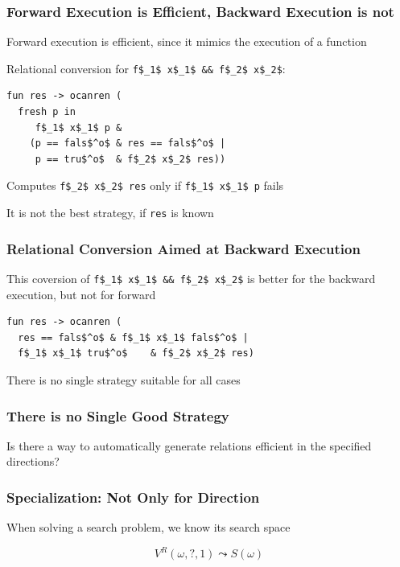 \documentclass[xcolor=table]{beamer}
\begin{document}
\begin{frame}[fragile]
  \transwipe[direction=90]
  \frametitle{Forward Execution is Efficient, Backward Execution is not}

  Forward execution is efficient, since it mimics the execution of a function

\vspace{6pt}

Relational conversion for \lstinline{f$_1$ x$_1$ && f$_2$ x$_2$}:

\begin{lstlisting}
fun res -> ocanren (
  fresh p in
     f$_1$ x$_1$ p &
    (p == fals$^o$ & res == fals$^o$ |
     p == tru$^o$  & f$_2$ x$_2$ res))
\end{lstlisting}

Computes \lstinline{f$_2$ x$_2$ res} only if \lstinline{f$_1$ x$_1$ p} fails

\vspace{6pt}

It is not the best strategy, if \lstinline{res} is known

\end{frame}

\begin{frame}[fragile]
  \transwipe[direction=90]
  \frametitle{Relational Conversion Aimed at Backward Execution}

This coversion of  \lstinline{f$_1$ x$_1$ && f$_2$ x$_2$} is better for the backward execution, but not for forward

\begin{lstlisting}
fun res -> ocanren (
  res == fals$^o$ & f$_1$ x$_1$ fals$^o$ |
  f$_1$ x$_1$ tru$^o$    & f$_2$ x$_2$ res)
\end{lstlisting}


  There is no single strategy suitable for all cases
\end{frame}

\begin{frame}[fragile]
  \transwipe[direction=90]
  \frametitle{There is no Single Good Strategy}

\begin{center}
Is there a way to automatically generate relations efficient in the specified directions?
\end{center}

\end{frame}


\begin{frame}[fragile]
  \transwipe[direction=90]
  \frametitle{Specialization: Not Only for Direction}
\begin{center} When solving a search problem, we know its search space  \end{center}

\[  V^R(\omega, ?, 1) \leadsto S(\omega) \]
\end{frame}
\end{document}
